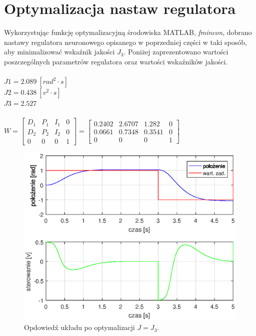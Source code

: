 \section{Optymalizacja nastaw regulatora}
Wykorzystując funkcję optymalizacyjną środowiska MATLAB, \textit{fmincon},  dobrano nastawy regulatora neuronowego opisanego w poprzedniej części w taki sposób, aby minimalizować wska\'znik jakości $J_3$. 
Poniżej zaprezentowano wartości poszczególnych parametrów regulatora oraz wartości wska\'zników jakości. \\
\\
$J1 = 2.089 \ [rad^2 \cdot s]$\\
$J2 = 0.438 \ [v^2 \cdot s] $\\
$J3 = 2.527$ \\
\\
$W = \begin{bmatrix}
D_1& P_1& I_1&0\\
D_2& P_2& I_2&0\\
0&0&0&1
\end{bmatrix} = 
\begin{bmatrix}
0.2402&2.6707& 1.282&0\\
0.0661& 0.7348&0.3541&0\\
0&0&0&1
\end{bmatrix} 
$
\begin{figure}[h!]
	\centering
	\includegraphics[scale = 1]{fig/neural_opt.eps}
	\caption		
	{Opdowied\'x układu po optymalizacji $J = J_3$.}
	\label{neuron_ster_opt}
\end{figure}
\\
